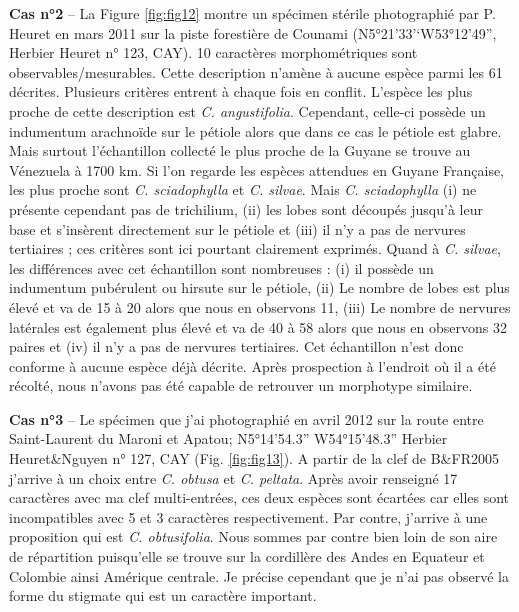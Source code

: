 \documentclass[a4paper]{article}
\theoremstyle{definition}
\theoremstyle{definition}
\theoremstyle{definition}
\theoremstyle{remark}
\begin{document}
\textbf{Cas n°2} -- La Figure \ref{fig:fig12} montre un spécimen stérile
photographié par P. Heuret en mars 2011 sur la piste forestière de
Counami (N5°21'33'`W53°12'49'', Herbier Heuret n° 123, CAY). 10
caractères morphométriques sont observables/mesurables. Cette
description n'amène à aucune espèce parmi les 61 décrites. Plusieurs
critères entrent à chaque fois en conflit. L'espèce les plus proche de
cette description est \emph{C. angustifolia}. Cependant, celle-ci
possède un indumentum arachnoïde sur le pétiole alors que dans ce cas le
pétiole est glabre. Mais surtout l'échantillon collecté le plus proche
de la Guyane se trouve au Vénezuela à 1700 km. Si l'on regarde les
espèces attendues en Guyane Française, les plus proche sont \emph{C.
sciadophylla} et \emph{C. silvae}. Mais \emph{C. sciadophylla} (i) ne
présente cependant pas de trichilium, (ii) les lobes sont découpés
jusqu'à leur base et s'insèrent directement sur le pétiole et (iii) il
n'y a pas de nervures tertiaires ; ces critères sont ici pourtant
clairement exprimés. Quand à \emph{C. silvae}, les différences avec cet
échantillon sont nombreuses : (i) il possède un indumentum pubérulent ou
hirsute sur le pétiole, (ii) Le nombre de lobes est plus élevé et va de
15 à 20 alors que nous en observons 11, (iii) Le nombre de nervures
latérales est également plus élevé et va de 40 à 58 alors que nous en
observons 32 paires et (iv) il n'y a pas de nervures tertiaires. Cet
échantillon n'est donc conforme à aucune espèce déjà décrite. Après
prospection à l'endroit où il a été récolté, nous n'avons pas été
capable de retrouver un morphotype similaire.

\textbf{Cas n°3} -- Le spécimen que j'ai photographié en avril 2012 sur
la route entre Saint-Laurent du Maroni et Apatou; N5°14'54.3''
W54°15'48.3'' Herbier Heuret\&Nguyen n° 127, CAY (Fig. \ref{fig:fig13}).
A partir de la clef de B\&FR2005 j'arrive à un choix entre \emph{C.
obtusa} et \emph{C. peltata}. Après avoir renseigné 17 caractères avec
ma clef multi-entrées, ces deux espèces sont écartées car elles sont
incompatibles avec 5 et 3 caractères respectivement. Par contre,
j'arrive à une proposition qui est \emph{C. obtusifolia}. Nous sommes
par contre bien loin de son aire de répartition puisqu'elle se trouve
sur la cordillère des Andes en Equateur et Colombie ainsi Amérique
centrale. Je précise cependant que je n'ai pas observé la forme du
stigmate qui est un caractère important.
\end{document}
